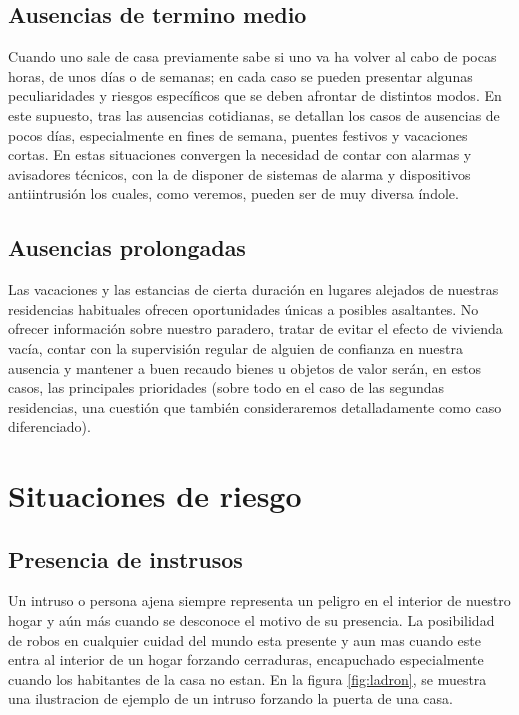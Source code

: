 
\subsection{Ausencias de termino medio}
Cuando uno sale de casa previamente sabe si uno va ha volver al cabo de pocas horas, de unos días o de semanas; en cada caso se pueden presentar algunas peculiaridades y riesgos específicos que se deben afrontar de distintos modos. En este supuesto, tras las ausencias cotidianas, se detallan los casos de ausencias de pocos días, especialmente en fines de semana, puentes festivos y vacaciones cortas. En estas situaciones convergen la necesidad de contar con alarmas y avisadores técnicos, con la de disponer de sistemas de alarma y dispositivos antiintrusión los cuales, como veremos, pueden ser de muy diversa índole.\\

\subsection{Ausencias prolongadas}
Las vacaciones y las estancias de cierta duración en lugares alejados de nuestras residencias habituales ofrecen oportunidades únicas a posibles asaltantes. No ofrecer información sobre nuestro paradero, tratar de evitar el efecto de vivienda vacía, contar con la supervisión regular de alguien de confianza en nuestra ausencia y mantener a buen recaudo bienes u objetos de valor serán, en estos casos, las principales prioridades (sobre todo en el caso de las segundas residencias, una cuestión que también consideraremos detalladamente como caso diferenciado).\\

\section{Situaciones de riesgo}
\subsection{Presencia de instrusos}
Un intruso o persona ajena siempre representa un peligro en el interior de nuestro hogar y aún más cuando se desconoce el motivo de su presencia. La posibilidad de robos en cualquier cuidad del mundo esta presente y aun mas cuando este entra al interior de un hogar forzando cerraduras, encapuchado especialmente cuando los habitantes de la casa no estan. En la figura \ref{fig:ladron}, se muestra una ilustracion de ejemplo de un intruso forzando la puerta de una casa.

